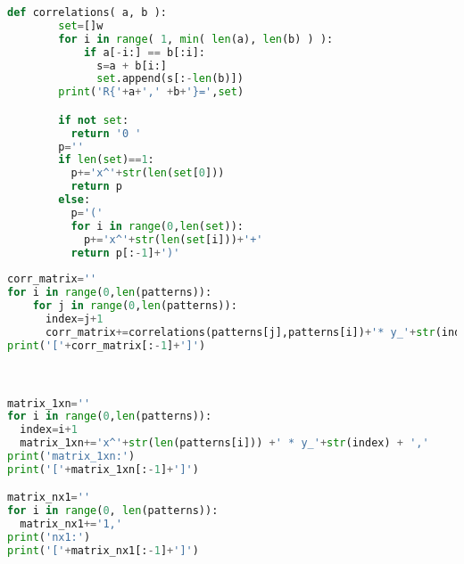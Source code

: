 \documentclass[12pt]{report}
\begin{document}
{{{\begin{lstlisting}[language=Python]
def correlations( a, b ):
        set=[]w
        for i in range( 1, min( len(a), len(b) ) ):
            if a[-i:] == b[:i]:
              s=a + b[i:]
              set.append(s[:-len(b)])
        print('R{'+a+',' +b+'}=',set)

        if not set:
          return '0 '
        p=''
        if len(set)==1:
          p+='x^'+str(len(set[0]))
          return p
        else:
          p='('
          for i in range(0,len(set)):
            p+='x^'+str(len(set[i]))+'+'
          return p[:-1]+')'
                  
corr_matrix=''
for i in range(0,len(patterns)):
    for j in range(0,len(patterns)):
      index=j+1
      corr_matrix+=correlations(patterns[j],patterns[i])+'* y_'+str(index)+','
print('['+corr_matrix[:-1]+']')



matrix_1xn=''
for i in range(0,len(patterns)):
  index=i+1
  matrix_1xn+='x^'+str(len(patterns[i])) +' * y_'+str(index) + ','
print('matrix_1xn:')
print('['+matrix_1xn[:-1]+']')

matrix_nx1=''
for i in range(0, len(patterns)):
  matrix_nx1+='1,'
print('nx1:')
print('['+matrix_nx1[:-1]+']')
\end{lstlisting}}\quad \\

}}
\end{document}
